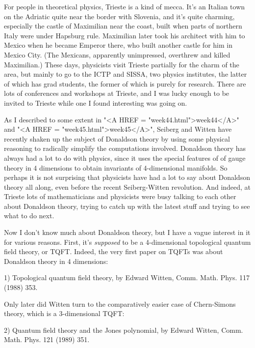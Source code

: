 

For people in theoretical physics, Trieste is a kind of mecca.  
It's an Italian town on the Adriatic quite near the border with 
Slovenia, and it's quite charming, especially the castle of 
Maximilian near the coast, built when parts of northern Italy were 
under Hapsburg rule.  Maximilian later took his architect with him 
to Mexico when he became Emperor there, who built another castle for 
him in Mexico City.  (The Mexicans, apparently unimpressed, overthrew
and killed Maximilian.)   These days, physicists visit Trieste
partially for the charm of the area, but mainly to go to 
the ICTP and SISSA, two physics institutes, the latter of which 
has grad students, the former of which is purely for research.
There are lots of conferences and workshops at Trieste, and
I was lucky enough to be invited to Trieste while one I found 
interesting was going on.

As I described to some extent in "<A HREF = "week44.html">week44</A>" and "<A HREF = "week45.html">week45</A>", Seiberg
and Witten have recently shaken up the subject of Donaldson theory
by using some physical reasoning to radically simplify the
computations involved.  Donaldson theory has always had a lot
to do with physics, since it uses the special features of 
of gauge theory in 4 dimensions to obtain invariants of 4-dimensional
manifolds.  So perhaps it is not surprising that physicists
have had a lot to say about Donaldson theory all along, even 
before the recent Seiberg-Witten revolution.  And indeed, at
Trieste lots of mathematicians and physicists were busy talking
to each other about Donaldson theory, trying to catch up with 
the latest stuff and trying to see what to do next.

Now I don't know much about Donaldson theory, but I have
a vague interest in it for various reasons.  First, it's
\emph{supposed} to be a 4-dimensional topological quantum field
theory, or TQFT.  Indeed, the very first paper on TQFTs was
about Donaldson theory in 4 dimensions:

1) Topological quantum field theory, by Edward Witten, Comm.
Math. Phys. 117 (1988) 353.

Only later did Witten turn to the comparatively easier
case of Chern-Simons theory, which is a 3-dimensional TQFT:

2) Quantum field theory and the Jones polynomial, by Edward
Witten, Comm. Math. Phys. 121 (1989) 351.

